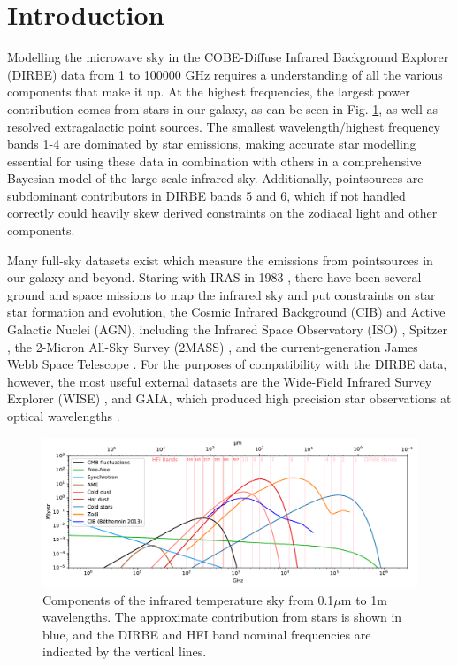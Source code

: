 \documentclass{aa}
\begin{document}
\setcounter{tocdepth}{2}
\tableofcontents
   
\section{Introduction}

Modelling the microwave sky in the COBE-Diffuse Infrared Background Explorer (DIRBE) data  \citep{DIRBE} from 1 to 100000 GHz requires a  understanding of all the various components that make it up. At the highest frequencies, the largest power contribution comes from stars in our galaxy, as can be seen in Fig. \ref{fig:sed}, as well as resolved extragalactic point sources. The smallest wavelength/highest frequency bands 1-4 are dominated by star emissions, making accurate star modelling essential for using these data in combination with others in a comprehensive Bayesian model of the large-scale infrared sky. Additionally, pointsources are subdominant contributors in DIRBE bands 5 and 6, which if not handled correctly could heavily skew derived constraints on the zodiacal light and other components.

Many full-sky datasets exist which measure the emissions from pointsources in our galaxy and beyond. Staring with IRAS in 1983 \citep{iras}, there have been several ground and space missions to map the infrared sky and put constraints on star star formation and evolution, the Cosmic Infrared Background (CIB) and Active Galactic Nuclei (AGN), including the Infrared Space Observatory (ISO) \citep{iso}, Spitzer \citep{spitzer}, the 2-Micron All-Sky Survey (2MASS) \citep{2mass}, and the current-generation James Webb Space Telescope \citep{jwst}. For the purposes of compatibility with the DIRBE data, however, the most useful external datasets are the Wide-Field Infrared Survey Explorer (WISE) \citep{wise}, and GAIA, which produced high precision star observations at optical wavelengths \citep{gaia}. 

\begin{figure}
  \centering
  \includegraphics[width=\textwidth]{figs/sed/all_fgs.pdf}
  \caption{Components of the infrared temperature sky from 0.1$\mu$m to 1m wavelengths. The approximate contribution from stars is shown in blue, and the DIRBE and HFI band nominal frequencies are indicated by the vertical lines.}
  \label{fig:sed}
\end{figure}
\end{document}
